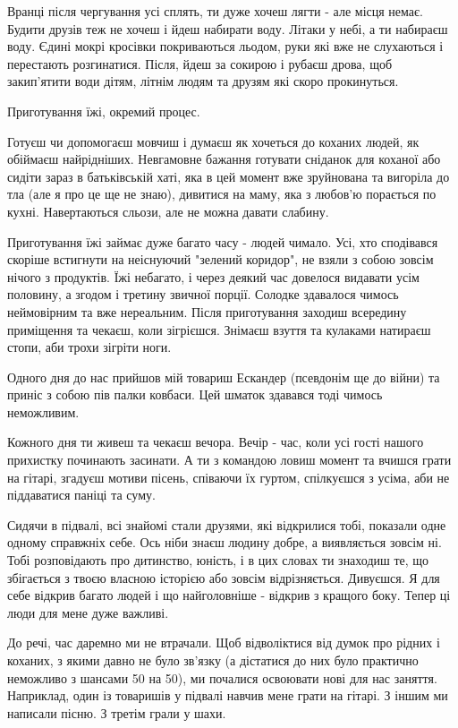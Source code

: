Вранці після чергування усі сплять, ти дуже хочеш лягти - але місця немає.
Будити друзів теж не хочеш і йдеш набирати воду. Літаки у небі, а ти набираєш
воду. Єдині мокрі кросівки покриваються льодом, руки які вже не слухаються і
перестають розгинатися. Після, йдеш за сокирою і рубаєш дрова, щоб закип'ятити
води дітям, літнім людям та друзям які скоро прокинуться. 

Приготування їжі, окремий процес.

Готуєш чи допомогаєш мовчиш і думаєш як хочеться до коханих людей, як
обіймаєш найрідніших. Невгамовне бажання готувати сніданок для коханої або
сидіти зараз в батьківській хаті, яка в цей момент вже зруйнована та вигоріла
до тла (але я про це ще не знаю), дивитися на маму, яка з любов'ю порається
по кухні. Навертаються сльози, але не можна давати слабину.

Приготування їжі займає дуже багато часу - людей чимало. Усі, хто сподівався
скоріше встигнути на неіснуючий "зелений коридор", не взяли з собою зовсім
нічого з продуктів. Їжі небагато, і через деякий час довелося видавати усім
половину, а згодом і третину звичної порції. Солодке здавалося чимось
неймовірним та вже нереальним. Після приготування заходиш всередину приміщення
та чекаєш, коли зігрієшся. Знімаєш взуття та кулаками натираєш стопи, аби трохи
зігріти ноги. 

Одного дня до нас прийшов мій товариш Ескандер (псевдонім ще до війни) та
приніс з собою пів палки ковбаси. Цей шматок здавався тоді чимось неможливим.

Кожного дня ти живеш та чекаєш вечора. Вечір - час, коли усі гості нашого
прихистку починають засинати. А ти з командою ловиш момент та вчишся грати на
гітарі, згадуєш мотиви пісень, співаючи їх гуртом, спілкуєшся з усіма, аби не
піддаватися паніці та суму. 

Сидячи в підвалі, всі знайомі стали друзями, які відкрилися тобі, показали одне
одному справжніх себе. Ось ніби знаєш людину добре, а виявляється зовсім ні.
Тобі розповідають про дитинство, юність, і в цих словах ти знаходиш те, що
збігається з твоєю власною історією або зовсім відрізняється. Дивуєшся. Я для
себе відкрив багато людей і що найголовніше - відкрив з кращого боку. Тепер ці
люди для мене дуже важливі. 

До речі, час даремно ми не втрачали. Щоб відволіктися від думок про рідних і
коханих, з якими давно не було зв'язку (а дістатися до них було практично
неможливо з шансами 50 на 50), ми почалися освоювати нові для нас заняття.
Наприклад, один із товаришів у підвалі навчив мене грати на гітарі. З іншим ми
написали пісню. З третім грали у шахи. 

